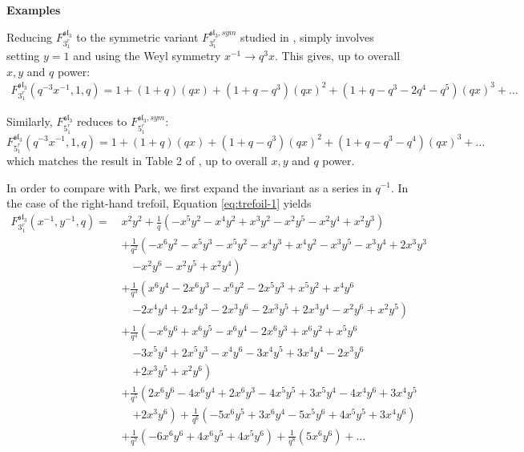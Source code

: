 \documentclass[12pt,oneside,reqno]{amsart}
\numberwithin{teorema}{section}
\numberwithin{definicion}{section}
\numberwithin{lema}{section}
\numberwithin{conjetura}{section}
\numberwithin{proposicion}{section}
\def\sl{\mathfrak{sl}}
\begin{document}
\textbf{Examples}

Reducing $F_{3_1^r}^{\sl_3}$ to the symmetric variant $F_{3_1^r}^{\sl_3,sym}$ studied in \cite{EGGKPS,gruen22}, simply involves setting $y = 1$ and using the Weyl symmetry $x^{-1}\rightarrow q^3 x$. This gives, up to overall $x,y$ and $q$ power:
\begin{equation*}\begin{split}
    F_{3_1^r}^{\sl_3}(q^{-3}x^{-1},1,q) =1 + (1 + q) (qx) + (1 + q - q^3) (q x)^2 + 
 (1 + q - q^3 - 2 q^4 - q^5) (qx)^3 + \dots   
\end{split}
\end{equation*}

Similarly, $F_{5_1^r}^{\sl_3}$ reduces to $F_{5_1^r}^{\sl_3,sym}$:
\begin{equation*}
    F_{5_1^r}^{\sl_3}(q^{-3}x^{-1},1,q) = 1 + (1+q)(q x) + (1+q-q^3)(qx)^2 + (1+q-q^3-q^4)(q x)^3+\dots
\end{equation*}
which matches the result in Table 2 of \cite{gruen22}, up to overall $x,y$ and $q$ power.

In order to compare with Park, we first expand the invariant as a series in $q^{-1}$. In the case of the right-hand trefoil, Equation \eqref{eq:trefoil-1}  yields
\begin{equation*}
    \begin{aligned}
        F_{3_1^r}^{\sl_3}(x^{-1},y^{-1},q) = \,&x^2 y^2 + \frac{1}{q} \left(-x^5 y^2-x^4 y^2+x^3 y^2-x^2 y^5-x^2 y^4+x^2 y^3\right) \\
        &+ \frac{1}{q^2} \left(-x^6 y^2-x^5 y^3-x^5 y^2-x^4 y^3+x^4 y^2-x^3 y^5-x^3 y^4+2 x^3 y^3\right.\\
        &\quad\left.-x^2 y^6-x^2 y^5+x^2 y^4\right) \\
        &+ \frac{1}{q^3} \left(x^6 y^4-2 x^6 y^3-x^6 y^2-2 x^5 y^3+x^5 y^2+x^4 y^6\right.\\
        &\quad\left.-2 x^4 y^4+2 x^4 y^3-2 x^3 y^6-2 x^3 y^5+2 x^3 y^4-x^2 y^6+x^2 y^5\right) \\
        &+ \frac{1}{q^4} \left(-x^6 y^6+x^6 y^5-x^6 y^4-2 x^6 y^3+x^6 y^2+x^5 y^6\right.\\
        &\quad\left.-3 x^5 y^4+2 x^5 y^3-x^4 y^6-3 x^4 y^5+3 x^4 y^4-2 x^3 y^6\right.\\
        &\quad\left.+2 x^3 y^5+x^2 y^6\right) \\
        &+ \frac{1}{q^5} \left(2 x^6 y^6-4 x^6 y^4+2 x^6 y^3-4 x^5 y^5+3 x^5 y^4-4 x^4 y^6+3 x^4 y^5\right.\\
        &\quad\left.+2 x^3 y^6\right) + \frac{1}{q^6} \left(-5 x^6 y^5+3 x^6 y^4-5 x^5 y^6+4 x^5 y^5+3 x^4 y^6\right) \\
        &+ \frac{1}{q^7} \left(-6 x^6 y^6+4 x^6 y^5+4 x^5 y^6\right) + \frac{1}{q^8} \left(5 x^6 y^6\right) + \dots
    \end{aligned}
\end{equation*}
\end{document}
